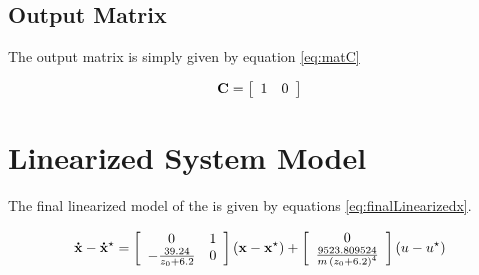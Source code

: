 \subsection{Output Matrix}

The output matrix is simply given by equation \ref{eq:matC}

\begin{equation}
	\label{eq:matC}
	{\bf C} = 
	\left[
		\begin{array}{cc}
			 1 & 0 \\
		\end{array}
	\right]
\end{equation}

\section{Linearized System Model}

The final linearized model of the is given by equations \ref{eq:finalLinearizedx}. %


\begin{equation}
	\label{eq:finalLinearizedx}
	{\bf \dot{x}} - {\bf \dot{x}^\star} = 
	\left[
		\begin{array}{cc}
			 0 & 1 \\
			 -{\frac {39.24}{z_0 + 6.2}} & 0 \\
		\end{array}
	\right]
	\left(
		{\bf x} - {\bf x^\star}
	\right)
	+ 
	\left[
		\begin{array}{c}
			 0 \\
			{\frac {9523.809524}{m\,\left( z_0 + 6.2 \right) ^{4}}} \\
		\end{array}
	\right]
	\left(
		u - u^\star
	\right)
\end{equation}